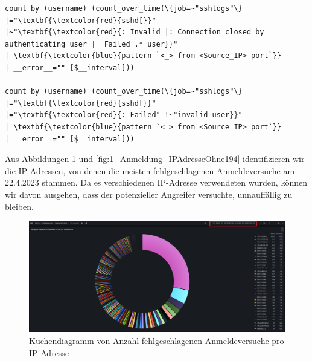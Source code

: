 {
\begin{Verbatim}[fontsize=\small,commandchars=\\\{\},frame=single]
count by (username) (count_over_time(\{job=~"sshlogs"\} 
|="\textbf{\textcolor{red}{sshd[}}"
|~"\textbf{\textcolor{red}{: Invalid |: Connection closed by authenticating user |  Failed .* user}}"
| \textbf{\textcolor{blue}{pattern `<_> from <Source_IP> port`}}
| __error__="" [$__interval]))

count by (username) (count_over_time(\{job=~"sshlogs"\}
|="\textbf{\textcolor{red}{sshd[}}"
|="\textbf{\textcolor{red}{: Failed" !~"invalid user}}"
| \textbf{\textcolor{blue}{pattern `<_> from <Source_IP> port`}}
| __error__="" [$__interval]))
\end{Verbatim}
}

Aus Abbildungen \ref{fig:1_Anmeldung_IPAdresse} und \ref{fig:1_Anmeldung_IPAdresseOhne194} identifizieren wir die IP-Adressen, von denen die meisten fehlgeschlagenen Anmeldeversuche am 22.4.2023 stammen. Da es verschiedenen IP-Adresse verwendeten wurden, können wir davon ausgehen, dass der potenzieller Angreifer versuchte, unnauffällig zu bleiben. 

\newpage
{}
\thispagestyle{lscape}
\begin{landscape}
    \begin{figure}[H]
        \centerline{\includegraphics[width=1.6\textwidth]{assets/Failed_pro_ip.png}}
        \caption[Kuchendiagramm von Anzahl fehlgeschlagenen Anmeldeversuche pro IP-Adresse]
        {Kuchendiagramm von Anzahl fehlgeschlagenen Anmeldeversuche pro IP-Adresse}
        \label{fig:1_Anmeldung_IPAdresse}
        \centering
    \end{figure}
\end{landscape}
\restoregeometry

